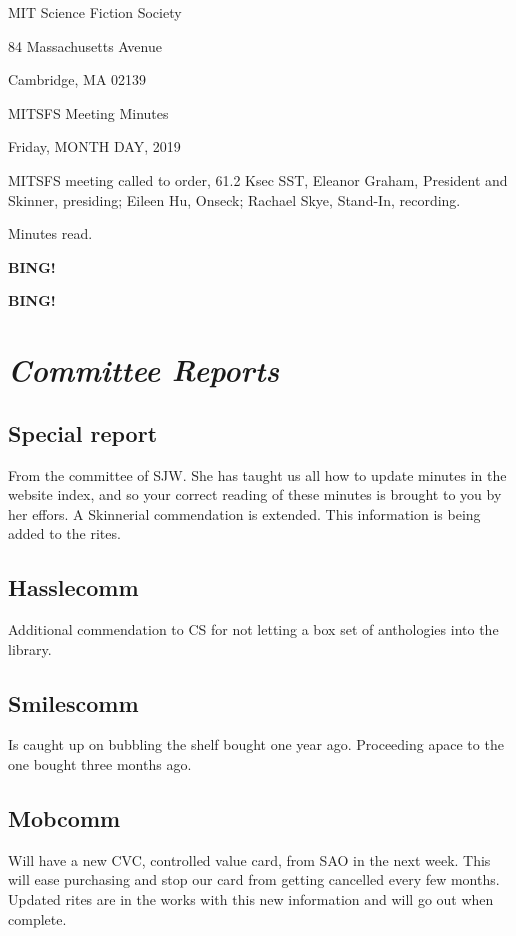 \documentclass[10pt]{article}
\newcommand{\bing}{{\bf BING!} }
\newcommand{\goto}[1]{\bing \vskip 12pt \section*{{\em{#1}}}}
\newcommand{\skinner}{Eleanor Graham, President and Skinner}
\newcommand{\onseck}{Eileen Hu, Onseck; Rachael Skye, Stand-In}
\newcommand{\meetingdate}{Friday, MONTH DAY, 2019 }
\begin{document}
\begin{center}

MIT Science Fiction Society

84 Massachusetts Avenue

Cambridge, MA 02139

\vspace{12pt}

MITSFS Meeting Minutes

\meetingdate

\end{center}

\vspace{18pt}

\setlength{\parskip}{6pt}

\noindent
MITSFS meeting called to order, 61.2 Ksec SST,
\skinner, presiding; \onseck, recording.

Minutes read.

\bing

\goto{Committee Reports}
\subsection{Special report} 
From the committee of SJW. She has taught us all how to update minutes in the website index, and so your correct reading of these minutes is brought to you by her effors. A Skinnerial commendation is extended. This information is being added to the rites.

\subsection{Hasslecomm}
Additional commendation to CS for not letting a box set of anthologies into the library.

\subsection{Smilescomm}
Is caught up on bubbling the shelf bought one year ago. Proceeding apace to the one bought three months ago.

\subsection{Mobcomm} 
Will have a new CVC, controlled value card, from SAO in the next week. This will ease purchasing and stop our card from getting cancelled every few months. Updated rites are in the works with this new information and will go out when complete.
\end{document}
